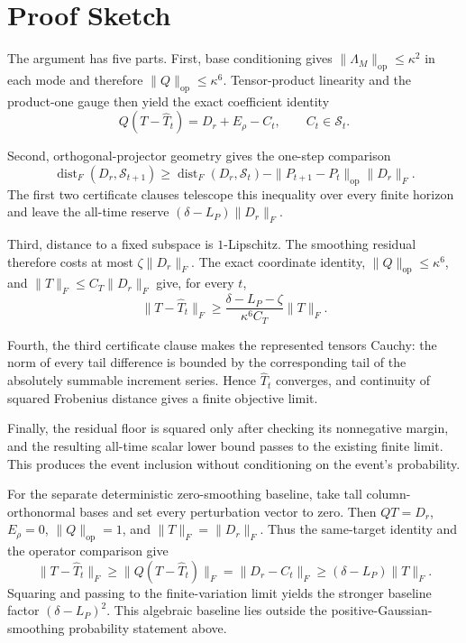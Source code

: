 \section{Proof Sketch}\label{sec:proof-sketch}

The argument has five parts.  First, base conditioning gives
$\|\Lambda_M\|_{\mathrm{op}}\leq\kappa^2$ in each mode and therefore
$\|Q\|_{\mathrm{op}}\leq\kappa^6$.  Tensor-product linearity and the
product-one gauge then yield the exact coefficient identity
\[
Q(T-\widehat T_t)=D_r+E_\rho-C_t,
\qquad C_t\in\mathcal S_t.
\]

Second, orthogonal-projector geometry gives the one-step comparison
\[
\operatorname{dist}_F(D_r,\mathcal S_{t+1})
\geq
\operatorname{dist}_F(D_r,\mathcal S_t)
-\|P_{t+1}-P_t\|_{\mathrm{op}}\|D_r\|_F.
\]
The first two certificate clauses telescope this inequality over every finite
horizon and leave the all-time reserve
$(\delta-L_P)\|D_r\|_F$.

Third, distance to a fixed subspace is $1$-Lipschitz.  The smoothing residual
therefore costs at most $\zeta\|D_r\|_F$.  The exact coordinate identity,
$\|Q\|_{\mathrm{op}}\leq\kappa^6$, and
$\|T\|_F\leq C_T\|D_r\|_F$ give, for every $t$,
\[
\|T-\widehat T_t\|_F
\geq
\frac{\delta-L_P-\zeta}{\kappa^6C_T}\|T\|_F.
\]

Fourth, the third certificate clause makes the represented tensors Cauchy:
the norm of every tail difference is bounded by the corresponding tail of the
absolutely summable increment series.  Hence $\widehat T_t$ converges, and
continuity of squared Frobenius distance gives a finite objective limit.

Finally, the residual floor is squared only after checking its nonnegative
margin, and the resulting all-time scalar lower bound passes to the existing
finite limit.  This produces the event inclusion without conditioning on the
event's probability.

For the separate deterministic zero-smoothing baseline, take tall
column-orthonormal bases and set every perturbation vector to zero.  Then
$QT=D_r$, $E_\rho=0$, $\|Q\|_{\mathrm{op}}=1$, and
$\|T\|_F=\|D_r\|_F$.  Thus the same-target identity and the operator
comparison give
\[
\|T-\widehat T_t\|_F
\geq\|Q(T-\widehat T_t)\|_F
=\|D_r-C_t\|_F
\geq(\delta-L_P)\|T\|_F.
\]
Squaring and passing to the finite-variation limit yields the stronger
baseline factor $(\delta-L_P)^2$.  This algebraic baseline lies outside the
positive-Gaussian-smoothing probability statement above.
